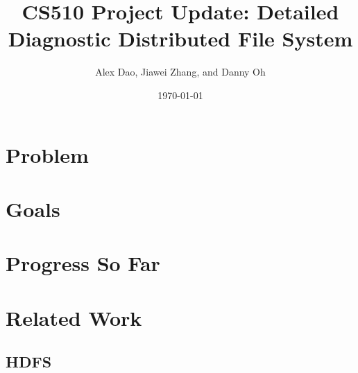 \documentclass{article}
\title{CS510 Project Update: Detailed Diagnostic Distributed File System}
\date{\today}
\author{Alex Dao, Jiawei Zhang, and Danny Oh}
\begin{document}
\maketitle

\section{Problem}

\section{Goals}

\section{Progress So Far}

\section{Related Work}
\subsection{HDFS}
\end{document}
